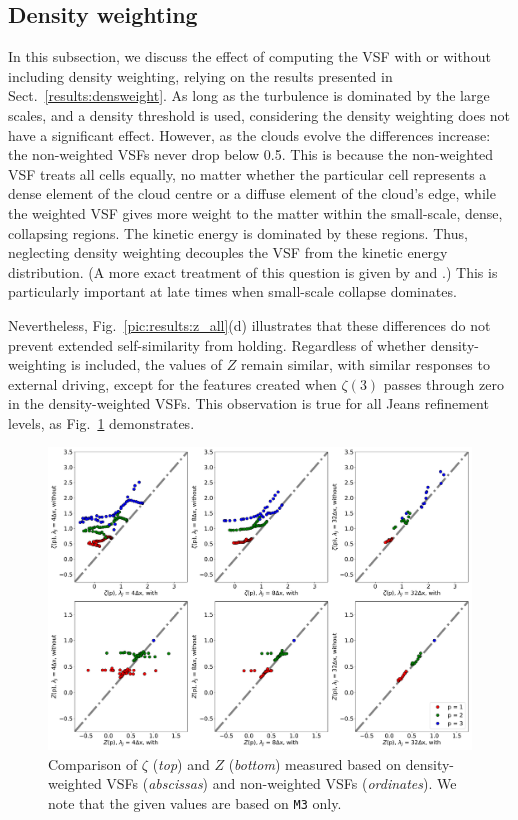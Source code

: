 \subsection{Density weighting}\label{discussion:densweight}

In this subsection, we discuss the effect of computing the VSF with or without including density weighting, relying on the results presented in Sect.~\ref{results:densweight}.
As long as the turbulence is dominated by the large scales, and a density threshold is used, considering the density weighting does not have a significant effect.
However, as the clouds evolve the differences increase:
the non-weighted VSFs never drop below 0.5.
This is because the non-weighted VSF treats all cells equally, no matter whether the particular cell represents a dense element of the cloud centre or a diffuse element of the cloud's edge, while the weighted VSF gives more weight to the matter within the small-scale, dense, collapsing regions.
The kinetic energy is dominated by these regions.
Thus, neglecting density weighting decouples the VSF from the kinetic energy distribution.
(A more exact treatment of this question is given by \citet{Kritsuk2013a} and \citet{Banerjee2017,Banerjee2018}.)
This is particularly important at late times when small-scale collapse dominates.

Nevertheless, Fig.~\ref{pic:results:z_all}(d) illustrates that these differences do not prevent extended self-similarity from holding. 
Regardless of whether density-weighting is included, the values of $Z$ remain similar, with similar responses to external driving, except for the features created when $\zeta(3)$ passes through zero in the density-weighted VSFs.
This observation is true for all Jeans refinement levels, as Fig.~\ref{pic:results:comp_weighting} demonstrates.


\begin{figure}
	\centering
    \includegraphics[width=\textwidth]{comp_weighting.pdf}
    \caption{ Comparison of $\zeta$ (\textit{top}) and $Z$ (\textit{bottom}) measured based on density-weighted VSFs (\textit{abscissas}) and non-weighted VSFs (\textit{ordinates}). We note that the given values are based on \texttt{M3} only.}
    \label{pic:results:comp_weighting}
\end{figure}


